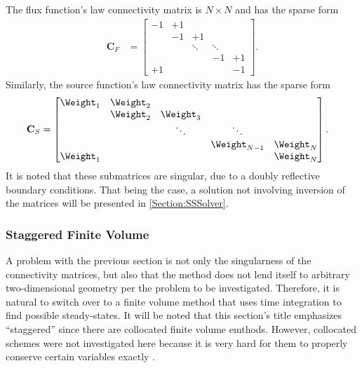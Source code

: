 The flux function's law connectivity matrix  is $N \times N$ and has the sparse form
\begin{align}
    \mathbf{C}_F &=  \begin{bmatrix}
                        -1     & +1  &        &        &          \\
                               & -1 & +1      &        &          \\
                               &    & \ddots & \ddots &          \\
                               &    &        &  -1    &  +1       \\
                        +1      &    &        &        & -1
                     \end{bmatrix}.
\end{align}
Similarly, the source function's law connectivity matrix has the sparse form
\begin{align}
    \mathbf{C}_S &=  \begin{bmatrix}
                       \Weight_1 & \Weight_2 &          &              &          \\
                                & \Weight_2 & \Weight_3 &              &          \\
                                &          & \ddots   & \ddots       &          \\
                                &          &          & \Weight_{N-1} & \Weight_N \\
                       \Weight_1 &          &          &              & \Weight_N
                     \end{bmatrix}.
\end{align}
It is noted that these submatrices are singular, due to a doubly reflective boundary conditions.
That being the case, a solution not involving inversion of the matrices will be presented in \cref{Section:SSSolver}.


\subsubsection{Staggered Finite Volume}
A problem with the previous section is not only the singularness of the connectivity matrices, but also that the method does not lend itself to arbitrary two-dimensional geometry per the problem to be investigated.
Therefore, it is natural to switch over to a finite volume method that uses time integration to find possible steady-states.
It will be noted that this section's title emphasizes ``staggered'' since there are collocated finite volume emthods.
However, collocated schemes were not investigated here because it is very hard for them to properly conserve certain variables exactly \cite{morinishi_fully_1998}.

